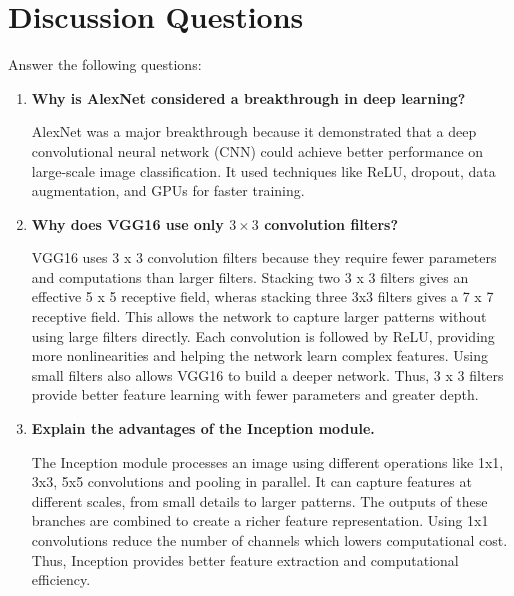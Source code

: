 \documentclass[11pt]{article}
\begin{document}
\section{Discussion Questions}
Answer the following questions:
\begin{enumerate}[leftmargin=*]
    \item \textbf{Why is AlexNet considered a breakthrough in deep learning?}
    
    \vspace{5mm}
    
    AlexNet was a major breakthrough because it demonstrated that a deep convolutional neural network (CNN) could achieve better performance on large-scale image classification.
    It used techniques like ReLU, dropout, data augmentation, and GPUs for faster training.
    
    \vspace{3mm}
    
    \item \textbf{Why does VGG16 use only $3 \times 3$ convolution filters?}
    
    \vspace{5mm}
    
    VGG16 uses 3 x 3 convolution filters because they require fewer parameters and computations than larger filters.
    Stacking two 3 x 3 filters gives an effective 5 x 5 receptive field, wheras stacking three 3x3 filters gives a 7 x 7 receptive field.
    This allows the network to capture larger patterns without using large filters directly.
    Each convolution is followed by ReLU, providing more nonlinearities and helping the network learn complex features.
    Using small filters also allows VGG16 to build a deeper network.
    Thus, 3 x 3 filters provide better feature learning with fewer parameters and greater depth.
    
    \vspace{3mm}
    
    \item \textbf{Explain the advantages of the Inception module.}
    
    \vspace{5mm}
    
    The Inception module processes an image using different operations like 1x1, 3x3, 5x5 convolutions and pooling in parallel.
    It can capture features at different scales, from small details to larger patterns.
    The outputs of these branches are combined to create a richer feature representation.
    Using 1x1 convolutions reduce the number of channels which lowers computational cost.
    Thus, Inception provides better feature extraction and computational efficiency.
    

\end{enumerate}
\end{document}
